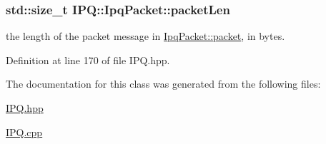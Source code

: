 \hypertarget{classIPQ_1_1IpqPacket_a9b448a070c5ae499e32d2af5a190b86d}{
\subsubsection[{packet\-Len}]{\setlength{\rightskip}{0pt plus 5cm}std\-::size\-\_\-t {\bf \-I\-P\-Q\-::\-Ipq\-Packet\-::packet\-Len}}}
\label{classIPQ_1_1IpqPacket_a9b448a070c5ae499e32d2af5a190b86d}


the length of the packet message in \hyperlink{classIPQ_1_1IpqPacket_a2bdf247f13a3e9f86e9e3846e6a9cb45}{\-Ipq\-Packet\-::packet}, in bytes. 



\-Definition at line 170 of file \-I\-P\-Q.\-hpp.



\-The documentation for this class was generated from the following files\-:\begin{DoxyCompactItemize}
\item 
\hyperlink{IPQ_8hpp}{\-I\-P\-Q.\-hpp}\item 
\hyperlink{IPQ_8cpp}{\-I\-P\-Q.\-cpp}\end{DoxyCompactItemize}
